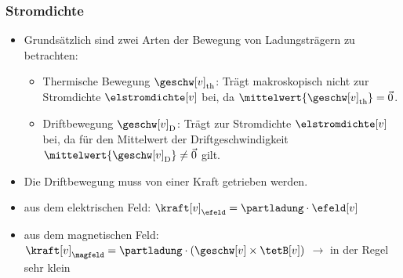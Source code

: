 \begin{frame}
  \frametitle{Stromdichte}


\begin{itemize}[<+->]
    \item Grundsätzlich sind zwei Arten der Bewegung von Ladungsträgern zu betrachten:
  \begin{itemize}[<+->]
    \item Thermische Bewegung \({\geschw[v]}_\mathrm{th}\): Trägt makroskopisch nicht zur Stromdichte \(\elstromdichte[v]\) bei, da \(\mittelwert{\geschw[v]_\mathrm{th}} = \vec{0} \).
    \item Driftbewegung \({\geschw[v]}_\mathrm{D}\): Trägt zur Stromdichte \(\elstromdichte[v] \) bei, da für den Mittelwert der Driftgeschwindigkeit \(\mittelwert{\geschw[v]_\mathrm{D}} \ne \vec{0} \) gilt.
\end{itemize}
\item Die Driftbewegung muss von einer Kraft getrieben werden.
\item aus dem elektrischen Feld: \(\kraft[v]_\mathrm{\efeld} = \partladung \cdot \efeld[v] \)
\item aus dem magnetischen Feld: \(\kraft[v]_\mathrm{\magfeld} = \partladung \cdot \left(\geschw[v] \times \tetB[v]\right) \) $\to$ in der Regel sehr klein 
\end{itemize}
\end{frame}

